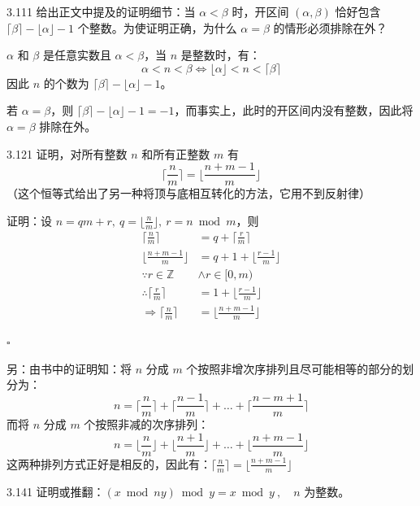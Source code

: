 \begin{problem}{3.11}{1}
  给出正文中提及的证明细节：当 \( \alpha < \beta \) 时，开区间 \( (\alpha , \beta) \) 恰好包含 \( \lceil \beta \rceil - \lfloor \alpha \rfloor - 1 \) 个整数。为使证明正确，为什么 \( \alpha = \beta \) 的情形必须排除在外？
\end{problem}

\( \alpha \) 和 \( \beta \) 是任意实数且 \( \alpha < \beta \)，当 \( n \) 是整数时，有：
\[
  \alpha < n < \beta \Leftrightarrow \lfloor \alpha \rfloor < n < \lceil \beta \rceil
\]
因此 \( n \) 的个数为 \( \lceil \beta \rceil - \lfloor \alpha \rfloor - 1 \)。

若 \( \alpha = \beta \)，则 \( \lceil \beta \rceil - \lfloor \alpha \rfloor - 1 = -1 \)，而事实上，此时的开区间内没有整数，因此将 \( \alpha = \beta \) 排除在外。

\begin{problem}{3.12}{1}
  证明，对所有整数 \( n \) 和所有正整数 \( m \) 有
  \[
    \lceil \frac{n}{m} \rceil = \lfloor \frac{n+m-1}{m} \rfloor
  \]
  （这个恒等式给出了另一种将顶与底相互转化的方法，它用不到反射律）
\end{problem}

证明：设 \( n = qm + r, \ q = \lfloor \frac{n}{m} \rfloor, \ r = n \bmod m \)，则
\begin{align*}
  \lceil \frac{n}{m} \rceil &= q + \lceil \frac{r}{m} \rceil \\
  \lfloor \frac{n+m-1}{m} \rfloor &= q + 1 + \lfloor \frac{r-1}{m} \rfloor \\
  \because r \in \mathbb{Z} &\land r \in [0, m) \\
  \therefore \lceil \frac{r}{m} \rceil &= 1 + \lfloor \frac{r-1}{m} \rfloor \\
  \Rightarrow \lceil \frac{n}{m} \rceil &= \lfloor \frac{n+m-1}{m} \rfloor
\end{align*}

\hfill \( \square \)

另：由书中的证明知：将 \( n \) 分成 \( m \) 个按照非增次序排列且尽可能相等的部分的划分为：
\[
  n = \lceil \frac{n}{m} \rceil + \lceil \frac{n-1}{m} \rceil + \dots + \lceil \frac{n-m+1}{m} \rceil
\]
而将 \( n \) 分成 \( m \) 个按照非减的次序排列：
\[
  n = \lfloor \frac{n}{m} \rfloor + \lfloor \frac{n+1}{m} \rfloor + \dots + \lfloor \frac{n+m-1}{m} \rfloor
\]
这两种排列方式正好是相反的，因此有：\( \lceil \frac{n}{m} \rceil = \lfloor \frac{n+m-1}{m} \rfloor \)

\begin{problem}{3.14}{1}
  证明或推翻：\( (x \bmod ny) \bmod y = x \bmod y \ , \quad n \) 为整数。
\end{problem}

